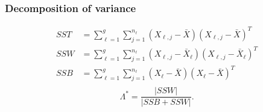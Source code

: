 \documentclass[aspectratio=169,10pt,t]{beamer}
\begin{document}
\begin{frame}[t]
	\frametitle{Decomposition of variance}
	\[
	\begin{aligned}
        SST &=
		\sum^{g}_{\ell=1} 
		\sum^{n_{\ell}}_{j=1} 
		\left( X_{\ell,j}- \bar{X} \right) 
		\left( X_{\ell,j}- \bar{X} \right) ^{T}\\
		SSW &=
		\sum^{g}_{\ell=1} 
		\sum^{n_{\ell}}_{j=1} 
		\left( X_{\ell,j}- \bar{X}_{\ell} \right) 
		\left( X_{\ell,j}- \bar{X}_{\ell} \right) ^{T}\\
		SSB &=
		\sum^{g}_{\ell=1} 
		\sum^{n_\ell}_{j=1} 
		\left( X_{\ell}- \bar{X} \right) 
		\left( X_{\ell}- \bar{X} \right) ^{T}\\
	\end{aligned}
	\] 
	\vspace{1cm}
    \pause
	\[
	\Lambda ^{*} = \frac{|SSW|}{|SSB + SSW |} 
	.\] 

\end{frame}
\end{document}
